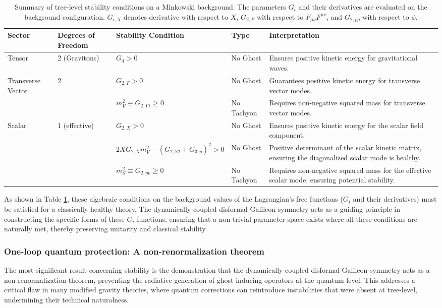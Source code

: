 \documentclass[twocolumn]{aastex631}
\begin{document}
\begin{table}[ht!]
\caption{Summary of tree-level stability conditions on a Minkowski background. The parameters $G_i$ and their derivatives are evaluated on the background configuration. $G_{i,X}$ denotes derivative with respect to $X$, $G_{2,F}$ with respect to $F_{\mu\nu}F^{\mu\nu}$, and $G_{2,pp}$ with respect to $\phi$.}
\label{tab:stability_conditions}
\centering
\begin{tabular}{p{} p{} p{} p{} p{}}
\hline
\textbf{Sector} & \textbf{Degrees of Freedom} & \textbf{Stability Condition} & \textbf{Type} & \textbf{Interpretation} \\
\hline
Tensor & 2 (Gravitons) & $G_4 > 0$ & No Ghost & Ensures positive kinetic energy for gravitational waves. \\
Transverse Vector & 2 & $G_{2,F} > 0$ & No Ghost & Guarantees positive kinetic energy for transverse vector modes. \\
& & $m_V^2 \equiv G_{2,Y1} \ge 0$ & No Tachyon & Requires non-negative squared mass for transverse vector modes. \\
Scalar & 1 (effective) & $G_{2,X} > 0$ & No Ghost & Ensures positive kinetic energy for the scalar field component. \\
& & $2X G_{2,X} m_V^2 - (G_{2,Y2} + G_{3,p})^2 > 0$ & No Ghost & Positive determinant of the scalar kinetic matrix, ensuring the diagonalized scalar mode is healthy. \\
& & $m_S^2 \equiv G_{2,pp} \ge 0$ & No Tachyon & Requires non-negative squared mass for the effective scalar mode, ensuring potential stability. \\
\hline
\end{tabular}
\end{table}

As shown in Table \ref{tab:stability_conditions}, these algebraic conditions on the background values of the Lagrangian's free functions ($G_i$ and their derivatives) must be satisfied for a classically healthy theory. The dynamically-coupled disformal-Galileon symmetry acts as a guiding principle in constructing the specific forms of these $G_i$ functions, ensuring that a non-trivial parameter space exists where all these conditions are naturally met, thereby preserving unitarity and classical stability.

\subsubsection{One-loop quantum protection: A non-renormalization theorem}
The most significant result concerning stability is the demonstration that the dynamically-coupled disformal-Galileon symmetry acts as a non-renormalization theorem, preventing the radiative generation of ghost-inducing operators at the quantum level. This addresses a critical flaw in many modified gravity theories, where quantum corrections can reintroduce instabilities that were absent at tree-level, undermining their technical naturalness.
\end{document}
